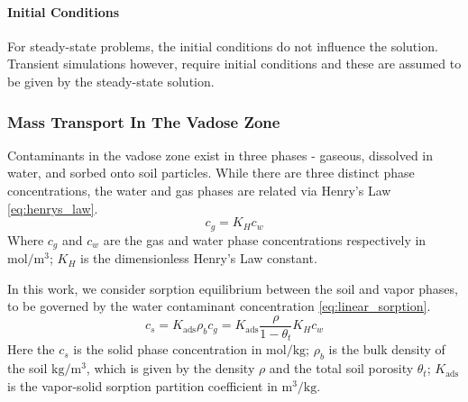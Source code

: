 \paragraph{Initial Conditions}

For steady-state problems, the initial conditions do not influence the solution.
Transient simulations however, require initial conditions and these are assumed to be given by the steady-state solution.\par

\subsubsection{Mass Transport In The Vadose Zone}\label{sec:mass_transport}

Contaminants in the vadose zone exist in three phases - gaseous, dissolved in water, and sorbed onto soil particles.
While there are three distinct phase concentrations, the water and gas phases are related via Henry's Law \eqref{eq:henrys_law}.
\begin{equation}\label{eq:henrys_law}
  c_g = K_H c_w
\end{equation}
Where $c_g$ and $c_w$ are the gas and water phase concentrations respectively in $\mathrm{mol/m^3}$;
$K_H$ is the dimensionless Henry's Law constant.\par

In this work, we consider sorption equilibrium between the soil and vapor phases, to be governed by the water contaminant concentration \eqref{eq:linear_sorption}.
\begin{equation}\label{eq:linear_sorption}
  c_s = K_\mathrm{ads} \rho_b c_g = K_\mathrm{ads} \frac{\rho}{1-\theta_t} K_H c_w
\end{equation}
Here the $c_s$ is the solid phase concentration in $\mathrm{mol/kg}$;
$\rho_b$ is the bulk density of the soil $\mathrm{kg/m^3}$, which is given by the density $\rho$ and the total soil porosity $\theta_t$;
$K_\mathrm{ads}$ is the vapor-solid sorption partition coefficient in $\mathrm{m^3/kg}$.\par

